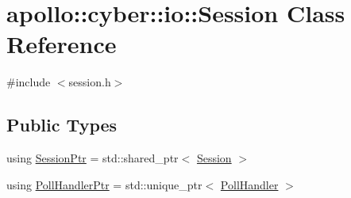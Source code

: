 \hypertarget{classapollo_1_1cyber_1_1io_1_1Session}{\section{apollo\-:\-:cyber\-:\-:io\-:\-:Session Class Reference}
\label{classapollo_1_1cyber_1_1io_1_1Session}
}


{\ttfamily \#include $<$session.\-h$>$}

\subsection*{Public Types}
\begin{DoxyCompactItemize}
\item 
using \hyperlink{classapollo_1_1cyber_1_1io_1_1Session_a1dff3f4dc860a04ae4a7a0c9d0e8de4f}{Session\-Ptr} = std\-::shared\-\_\-ptr$<$ \hyperlink{classapollo_1_1cyber_1_1io_1_1Session}{Session} $>$
\item 
using \hyperlink{classapollo_1_1cyber_1_1io_1_1Session_a24c58eb44ed5df020876be84cdb071a5}{Poll\-Handler\-Ptr} = std\-::unique\-\_\-ptr$<$ \hyperlink{classapollo_1_1cyber_1_1io_1_1PollHandler}{Poll\-Handler} $>$
\end{DoxyCompactItemize}

